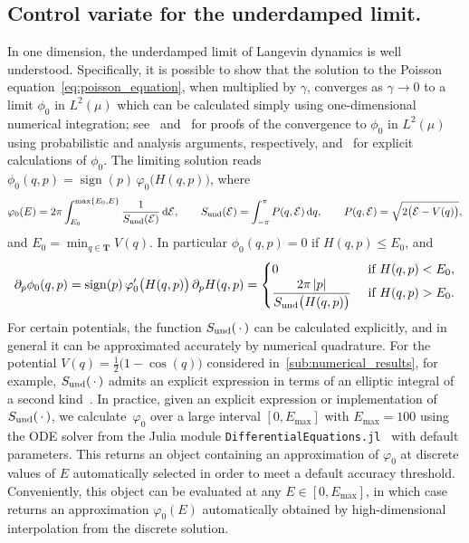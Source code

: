 \documentclass[11pt,a4paper]{article}
\DeclareMathOperator{\sign}{sign}
\newcommand{\dummy}{\,\cdot\,}
\newcommand{\torus}{\mathbf T}
\renewcommand{\d}{\mathrm d}
\theoremstyle{plain}
\numberwithin{equation}{section}
\renewcommand{\leq}{\leqslant}
\begin{document}
\subsection{Control variate for the underdamped limit.}%
\label{sub:underdamped_approach}
In one dimension,
the underdamped limit of Langevin dynamics is well understood.
Specifically, it is possible to show that the solution to the Poisson equation~\eqref{eq:poisson_equation},
when multiplied by $\gamma$,
converges as $\gamma \to 0$ to a limit $\phi_0$ in $L^2(\mu)$ which can be calculated simply using one-dimensional numerical integration;
see~\cite[Lemma 3.4]{MR2394704} and~\cite[Proposition 4.1]{roussel_thesis}
for proofs of the convergence to $\phi_0$ in $L^2(\mu)$ using probabilistic and analysis arguments,
respectively,
and~\cite{MR2427108} for explicit calculations of $\phi_0$.
The limiting solution reads $\phi_0(q,p) = \sign(p) \, \varphi_0\bigl(H(q,p)\bigr)$,
where
\[
    \varphi_0(E) = 2 \pi \int_{E_0}^{\max\{E_0, E\}} \frac{1}{S_{\rm und}(\mathcal E)} \, \d \mathcal E,
    \qquad S_{\rm und}(\mathcal E) = \int_{-\pi}^{\pi} P(q, \mathcal E) \, \d q, \qquad P(q, \mathcal E) = \sqrt {2 \bigl(\mathcal E - V(q)\bigr)},
\]
and $E_0 = \min_{q \in \torus} V(q)$.
In particular $\phi_0(q,p) = 0$ if $H(q,p) \leq E_0$,
and
\[
    \partial_p \phi_0(q, p)
    = \sign(p) \, \varphi_0'\bigl(H(q,p)\bigr) \, \partial_p H(q,p)
    =
    \begin{cases}
        0 & \text{ if $H(q,p) < E_0$}, \\
        \displaystyle \frac{2 \pi \abs{p}}{S_{\rm und}\bigl(H(q,p)\bigr)} & \text{ if $H(q,p) > E_0$}.
    \end{cases}
\]
For certain potentials,
the function $S_{\rm und}(\dummy)$ can be calculated explicitly,
and in general it can be approximated accurately by numerical quadrature.
For the potential $V(q) = \frac{1}{2} \bigl(1 - \cos(q)\bigr)$ considered in~\cref{sub:numerical_results},
for example, $S_{\rm und}(\dummy)$ admits an explicit expression in terms of an elliptic integral of a second kind~\cite{MR2427108}.
In practice, given an explicit expression or implementation of~$S_{\rm und}(\dummy)$,
we calculate~$\varphi_0$ over a large interval $[0, E_{\max}]$ with $E_{\max} = 100$
using the ODE solver from the Julia module \texttt{DifferentialEquations.jl}~\cite{rackauckas2017differentialequations} with default parameters.
This returns an object containing an approximation of $\varphi_0$ at discrete values of $E$ automatically selected in order to meet a default accuracy threshold.
Conveniently, this object can be evaluated at any $E \in [0, E_{\max}]$,
in which case returns an approximation $\varphi_0(E)$ automatically obtained by high-dimensional interpolation from the discrete solution.
\end{document}
